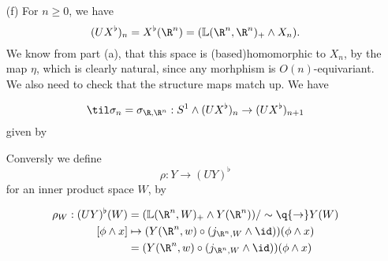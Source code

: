 \begin{exercise}[2]
\begin{enumerate}
\item[(f)]
For $n \ge 0$, we have 
\[ (UX^\flat)_n = X^\flat(\R^n) = (\L(\R^n,\R^n)_+  \wedge X_n). \]
We know from part (a), that this space is (based)homomorphic to $X_n$, by the
map $\eta$, which is clearly natural, since any morhphism is $O(n)$-equivariant.
We also need to check that the structure maps match up. We have

\[ \til\sigma_n = \sigma_{\R,\R^n} : S^1 \wedge (UX^\flat)_n \to (U
X^\flat)_{n+1} \]
given by

Conversly we define 
\[ \rho : Y \to (UY)^\flat \]
for an inner product space $W$, by

\begin{align*}
\rho_W : (UY)^\flat(W) &= (\L(\R^n,W)_+ \wedge Y(\R^n))/\sim \q{\to} Y(W) \\
\text{$[$} \phi \wedge x] &\mapsto (Y(\R^n,w) \circ (j_{\R^n,W} \wedge \id))(\phi \wedge
x) \\
&= (Y(\R^n,w) \circ (j_{\R^n,W} \wedge \id))(\phi \wedge x) 
\end{align*}

% 





\end{enumerate}
\end{exercise}


